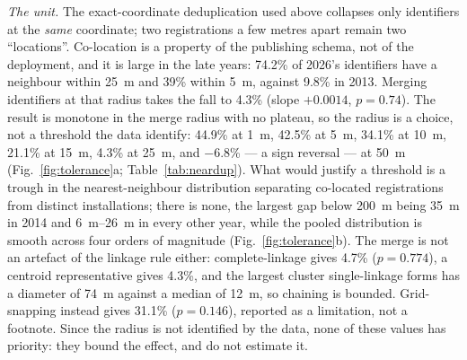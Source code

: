 \documentclass[fleqn,10pt,lineno]{wlpeerj}
\newcommand{\tolFallOne}{44.9}
\newcommand{\tolFallFive}{42.5}
\newcommand{\tolFallTen}{34.1}
\newcommand{\tolFallFifteen}{21.1}
\newcommand{\tolFallFifty}{-6.8}
\newcommand{\clFall}{4.7}
\newcommand{\clP}{0.774}
\newcommand{\chainMax}{74}
\newcommand{\chainMedian}{12}
\newcommand{\gridSnapFall}{31.1}
\newcommand{\gridSnapP}{0.146}
\newcommand{\nnGapMax}{35}
\begin{document}
\noindent\emph{The unit.} The exact-coordinate deduplication used above collapses only
identifiers at the \emph{same} coordinate; two registrations a few metres apart remain two
``locations''. Co-location is a property of the publishing schema, not of the deployment, and it
is large in the late years: \num{74.2}\% of 2026's identifiers have a neighbour within
\SI{25}{\meter} and \num{39}\% within \SI{5}{\meter}, against \num{9.8}\% in 2013. Merging
identifiers at that radius takes the fall to \num{4.3}\% (slope $+0.0014$, $p = 0.74$). The
result is monotone in the merge radius with no plateau, so the radius is a choice, not a
threshold the data identify: \num{\tolFallOne}\% at \SI{1}{\meter}, \num{\tolFallFive}\% at
\SI{5}{\meter}, \num{\tolFallTen}\% at \SI{10}{\meter}, \num{\tolFallFifteen}\% at
\SI{15}{\meter}, \num{4.3}\% at \SI{25}{\meter}, and \num{\tolFallFifty}\% --- a sign reversal
--- at \SI{50}{\meter} (Fig.~\ref{fig:tolerance}a; Table~\ref{tab:neardup}). What would justify a threshold is a trough
in the nearest-neighbour distribution separating co-located registrations from distinct
installations; there is none, the largest gap below \SI{200}{\meter} being \SI{\nnGapMax}{\meter}
in 2014 and \SIrange{6}{26}{\meter} in every other year, while the pooled distribution is smooth
across four orders of magnitude (Fig.~\ref{fig:tolerance}b). The merge is not an artefact of
the linkage rule either: complete-linkage gives \num{\clFall}\% ($p = \clP$), a centroid
representative gives \num{4.3}\%, and the largest cluster single-linkage forms has a diameter of
\SI{\chainMax}{\meter} against a median of \SI{\chainMedian}{\meter}, so chaining is bounded.
Grid-snapping instead gives \num{\gridSnapFall}\% ($p = \gridSnapP$), reported as a
limitation, not a footnote. Since the radius is not identified by the data, none of
these values has priority: they bound the effect, and do not estimate it.
\end{document}
